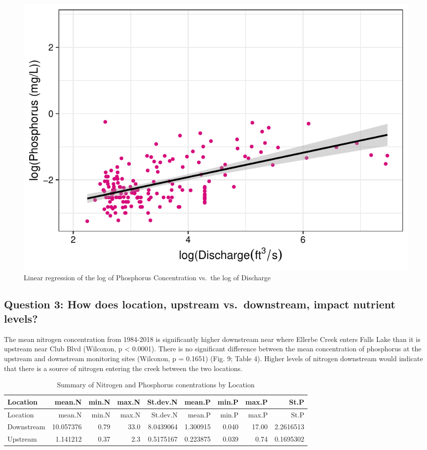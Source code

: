 \documentclass[12pt,]{article}
\begin{document}
\begin{figure}
\centering
\includegraphics{Landman_ENV872_Project_files/figure-latex/Data Analysis Figure 8-1.pdf}
\caption{Linear regression of the log of Phosphorus Concentration
vs.~the log of Discharge}
\end{figure}

\newpage

\hypertarget{question-3-how-does-location-upstream-vs.downstream-impact-nutrient-levels}{%
\subsection{Question 3: How does location, upstream vs.~downstream,
impact nutrient
levels?}\label{question-3-how-does-location-upstream-vs.downstream-impact-nutrient-levels}}

The mean nitrogen concentration from 1984-2018 is significantly higher
downstream near where Ellerbe Creek enters Falls Lake than it is
upstream near Club Blvd (Wilcoxon, p \textless{} 0.0001). There is no
significant difference between the mean concentration of phosphorus at
the upstream and downstream monitoring sites (Wilcoxon, p = 0.1651)
(Fig. 9; Table 4). Higher levels of nitrogen downstream would indicate
that there is a source of nitrogen entering the creek between the two
locations.

\begin{longtable}[]{@{}lrrrrrrrr@{}}
\caption{Summary of Nitrogen and Phosphorus conentrations by
Location}\tabularnewline
\toprule
Location & mean.N & min.N & max.N & St.dev.N & mean.P & min.P & max.P &
St.P\tabularnewline
\midrule
\endfirsthead
\toprule
Location & mean.N & min.N & max.N & St.dev.N & mean.P & min.P & max.P &
St.P\tabularnewline
\midrule
\endhead
Downstream & 10.057376 & 0.79 & 33.0 & 8.0439064 & 1.300915 & 0.040 &
17.00 & 2.2616513\tabularnewline
Upstream & 1.141212 & 0.37 & 2.3 & 0.5175167 & 0.223875 & 0.039 & 0.74 &
0.1695302\tabularnewline
\bottomrule
\end{longtable}
\end{document}
